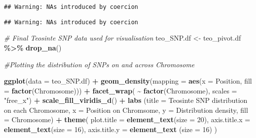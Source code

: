 \documentclass[
]{article}
\newenvironment{Shaded}{\begin{snugshade}}{\end{snugshade}}
\newcommand{\AttributeTok}[1]{\textcolor[rgb]{0.13,0.29,0.53}{#1}}
\newcommand{\CommentTok}[1]{\textcolor[rgb]{0.56,0.35,0.01}{\textit{#1}}}
\newcommand{\DecValTok}[1]{\textcolor[rgb]{0.00,0.00,0.81}{#1}}
\newcommand{\FunctionTok}[1]{\textcolor[rgb]{0.13,0.29,0.53}{\textbf{#1}}}
\newcommand{\NormalTok}[1]{#1}
\newcommand{\OtherTok}[1]{\textcolor[rgb]{0.56,0.35,0.01}{#1}}
\newcommand{\SpecialCharTok}[1]{\textcolor[rgb]{0.81,0.36,0.00}{\textbf{#1}}}
\newcommand{\StringTok}[1]{\textcolor[rgb]{0.31,0.60,0.02}{#1}}
\begin{document}
\begin{verbatim}
## Warning: NAs introduced by coercion
\end{verbatim}

\begin{Shaded}
\end{Shaded}

\begin{verbatim}
## Warning: NAs introduced by coercion
\end{verbatim}

\begin{Shaded}
\begin{Highlighting}[]
\CommentTok{\# Final Teosinte SNP data used for visualisation}
\NormalTok{teo\_SNP.df }\OtherTok{\textless{}{-}}\NormalTok{ teo\_pivot.df }\SpecialCharTok{\%\textgreater{}\%} \FunctionTok{drop\_na}\NormalTok{()}



\CommentTok{\#Plotting the distribution of SNPs on and across Chromosome}

\FunctionTok{ggplot}\NormalTok{(}\AttributeTok{data =}\NormalTok{ teo\_SNP.df) }\SpecialCharTok{+} 
  \FunctionTok{geom\_density}\NormalTok{(}\AttributeTok{mapping =} \FunctionTok{aes}\NormalTok{(}\AttributeTok{x =}\NormalTok{ Position, }\AttributeTok{fill =} \FunctionTok{factor}\NormalTok{(Chromosome))) }\SpecialCharTok{+} 
  \FunctionTok{facet\_wrap}\NormalTok{( }\SpecialCharTok{\textasciitilde{}} \FunctionTok{factor}\NormalTok{(Chromosome), }\AttributeTok{scales =} \StringTok{"free\_x"}\NormalTok{) }\SpecialCharTok{+} 
  \FunctionTok{scale\_fill\_viridis\_d}\NormalTok{() }\SpecialCharTok{+} 
  \FunctionTok{labs}\NormalTok{ (}\AttributeTok{title =} \StringTok{\textquotesingle{}Teosinte SNP distribution on each Chromosome\textquotesingle{}}\NormalTok{, }
        \AttributeTok{x =} \StringTok{\textquotesingle{}Position on Chromsome\textquotesingle{}}\NormalTok{, }
        \AttributeTok{y =} \StringTok{\textquotesingle{}Distribution density\textquotesingle{}}\NormalTok{, }
        \AttributeTok{fill =} \StringTok{\textquotesingle{}Chromosome\textquotesingle{}}\NormalTok{) }\SpecialCharTok{+} 
  \FunctionTok{theme}\NormalTok{( }\AttributeTok{plot.title =} \FunctionTok{element\_text}\NormalTok{(}\AttributeTok{size =} \DecValTok{20}\NormalTok{),}
         \AttributeTok{axis.title.x =} \FunctionTok{element\_text}\NormalTok{(}\AttributeTok{size =} \DecValTok{16}\NormalTok{),}
         \AttributeTok{axis.title.y =} \FunctionTok{element\_text}\NormalTok{ (}\AttributeTok{size =} \DecValTok{16}\NormalTok{)}
\NormalTok{  )}
\end{Highlighting}
\end{Shaded}
\end{document}
